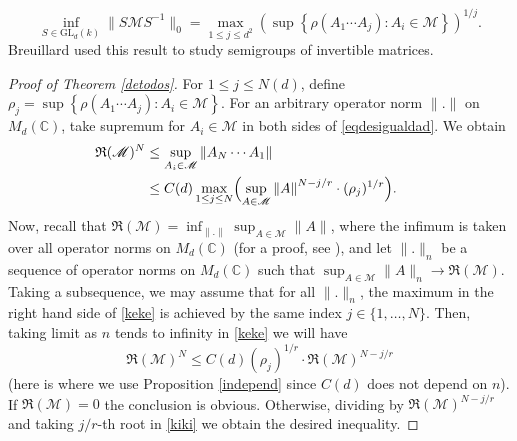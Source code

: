 \documentclass[11pt]{article}
\let\mathcal\mathscr
\theoremstyle{plain}
\theoremstyle{definition}
\newcommand{\CC}{\mathbb{C}}
\newcommand{\corchete}[1]{\left\{{#1}\right\}}
\begin{document}
\begin{equation*}
\inf_{S\in \mathrm{GL}_d(k)}{\|S\mathcal{M}S^{-1}\|_0}=\max_{1\leq j\leq d^2}{\left(\sup\corchete{\rho(A_{1}\cdots A_{j}) : A_{i}\in \mathcal{M}}\right)^{1/j}}.
\end{equation*}
Breuillard used this result to study semigroups of invertible matrices.
\begin{proof}[Proof of Theorem \ref{detodos}]
For $1\leq j\leq N(d)$, define $\rho_{j}=\sup\corchete{\rho(A_{1}\cdots A_{j}) : A_{i}\in \mathcal{M}}$. For an arbitrary operator norm $\|.\|$ on $M_{d}(\CC)$, take supremum for $A_{i}\in \mathcal{M}$ in both sides of \eqref{eqdesigualdad}. We obtain
\begin{alignat}{2}
\mathfrak{R}(\mathcal{M})^{N} & \leq\sup_{A_{i}\in \mathcal{M}}{\|A_{N}\cdots A_{1}\|} \notag\\
& \leq C(d) \max_{1\leq j\leq N}\Bigl(\sup_{A\in \mathcal{M}}{\|A\|}^{N-j/r}\cdot (\rho_{j})^{1/r}\Bigr). &\quad \label{keke}
\end{alignat}
Now, recall that $\mathfrak{R}(\mathcal{M})=\inf_{\|.\|}{\sup_{A\in \mathcal{M}}{\|A\|}}$, where the infimum is taken over all operator norms on $M_{d}(\CC)$ (for a proof, see \cite{rota}), and let $\|.\|_{n}$ be a sequence of operator norms on $M_{d}(\CC)$ such that $\sup_{A\in \mathcal{M}}{\|A\|_{n}}\to \mathfrak{R}(\mathcal{M})$. Taking a subsequence, we may assume that for all $\|.\|_{n}$, the maximum in the right hand side of \eqref{keke} is achieved by the same index $j\in \{1,\dots, N \}$. Then, taking limit as $n$ tends to infinity in \eqref{keke} we will have
\begin{equation}\label{kiki}
\mathfrak{R}(\mathcal{M})^{N}\leq C(d)(\rho_{j})^{1/r}\cdot\mathfrak{R}(\mathcal{M})^{N-j/r }
\end{equation}
(here is where we use Proposition \ref{independ} since $C(d)$ does not depend on $n$). If $\mathfrak{R}(\mathcal{M})=0$ the conclusion is obvious. Otherwise, dividing by $\mathfrak{R}(\mathcal{M})^{N-j/r}$ and taking $j/r$-th root in \eqref{kiki} we obtain the desired inequality.
\end{proof}
\end{document}
